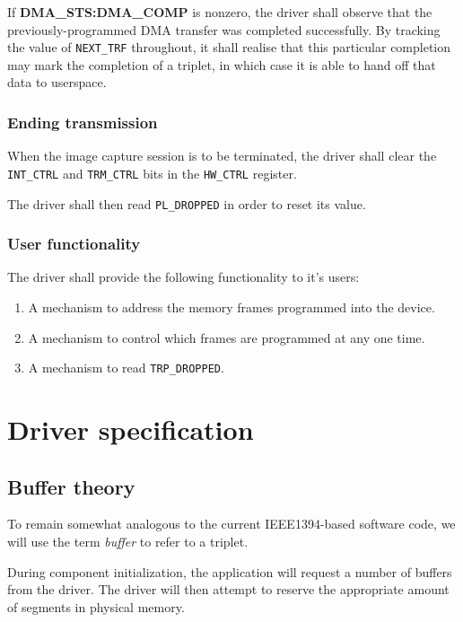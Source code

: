 \documentclass[12pt]{article}
\begin{document}
If \textbf{DMA\_STS:DMA\_COMP} is nonzero, the driver shall observe that the previously-programmed DMA transfer was completed successfully. By tracking the value of \texttt{NEXT\_TRF} throughout, it shall realise that this particular completion may mark the completion of a triplet, in which case it is able to hand off that data to userspace.

\subsubsection{Ending transmission}

When the image capture session is to be terminated, the driver shall clear the \texttt{INT\_CTRL} and \texttt{TRM\_CTRL} bits in the \texttt{HW\_CTRL} register.

The driver shall then read \texttt{PL\_DROPPED} in order to reset its value.

\subsubsection{User functionality}

The driver shall provide the following functionality to it's users:

\begin{enumerate}
\item A mechanism to address the memory frames programmed into the device.
\item A mechanism to control which frames are programmed at any one time.
\item A mechanism to read \texttt{TRP\_DROPPED}.
\end{enumerate}

\section{Driver specification}

\subsection{Buffer theory}

To remain somewhat analogous to the current IEEE1394-based software code, we will use the term \textit{buffer} to refer to a triplet.

During component initialization, the application will request a number of buffers from the driver. The driver will then attempt to reserve the appropriate amount of segments in physical memory.
\end{document}
